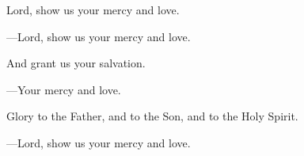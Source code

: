 \responsory

\begin{hangpar}
Lord, show us your mercy and love.

{\color{red}---\thinspace }Lord, show us your mercy and love.

\medskip And grant us your salvation.

{\color{red}---\thinspace }Your mercy and love.

\medskip Glory to the Father, and to the Son, and to the Holy Spirit.

{\color{red}---\thinspace }Lord, show us your mercy and love.
\end{hangpar}